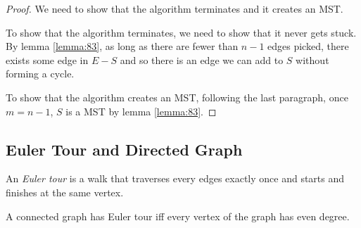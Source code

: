 \documentclass[11pt]{article}
\begin{document}
\begin{proof}
We need to show that the algorithm terminates and it creates an MST.

To show that the algorithm terminates, we need to show that it never gets stuck. By lemma
\ref{lemma:83}, as long as there are fewer than $n-1$ edges picked, there exists some edge in $E-S$ and
so there is an edge we can add to $S$ without forming a cycle.

To show that the algorithm creates an MST, following the last paragraph, once $m=n-1$, $S$ is a MST by
lemma \ref{lemma:83}.
\end{proof}

\subsection{Euler Tour and Directed Graph}

\begin{definition}
An \emph{Euler tour} is a walk that traverses every edges exactly once and starts and finishes at
the same vertex.
\end{definition}

\begin{theorem}
A connected graph has Euler tour iff every vertex of the graph has even degree.
\end{theorem}
\end{document}
